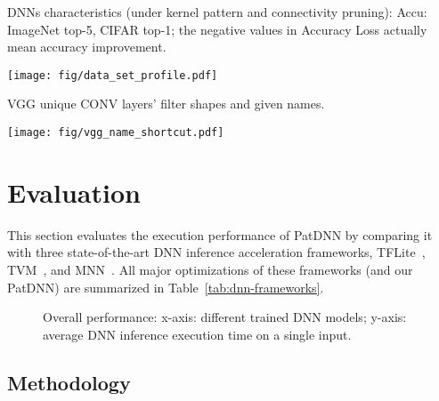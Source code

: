 \documentclass[sigplan,screen]{acmart}
\begin{document}
 
\begin{table}[t]
\caption{DNNs characteristics (under kernel pattern and connectivity pruning): Accu: ImageNet top-5, CIFAR top-1; the negative values in Accuracy Loss actually mean accuracy improvement.}
\label{tab:datasets}
\centering
\texttt{[image: fig/data\_set\_profile.pdf]}
\end{table}

\begin{table}[t]
\caption{VGG unique CONV layers' filter shapes and given names.}
\label{tab:eva_vgg_shortname}
\centering
\texttt{[image: fig/vgg\_name\_shortcut.pdf]}
\vspace{0.1cm}
\end{table}

\section{Evaluation}\label{sec:evaluation}

This section evaluates the execution performance of PatDNN by comparing it with three state-of-the-art DNN inference acceleration frameworks, 
TFLite~\cite{TensorFlow-Lite}, TVM~\cite{chen2018tvm}, and MNN~\cite{Ali-MNN}. 
All major optimizations of these frameworks (and our PatDNN) are summarized in Table~\ref{tab:dnn-frameworks}.   

\begin{figure*}[t]
    \centering
        \caption{Overall performance: x-axis: different trained DNN models; y-axis: average DNN inference execution time on a single input.}
    \label{fig:eva_overview_performance}
        \vspace{-1em}
\end{figure*}


\subsection{Methodology}
\end{document}
